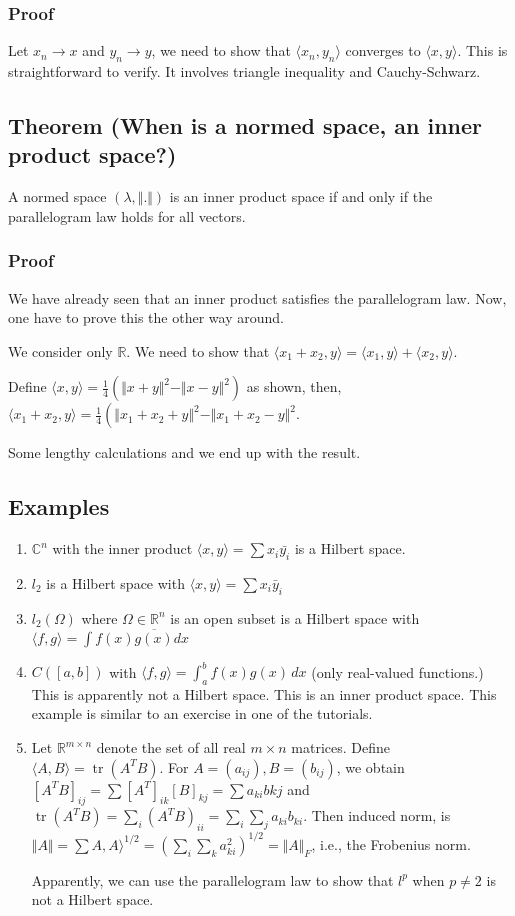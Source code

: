 \documentclass[11pt]{article}
\def\R{\mathbb{R}}
\def\C{\mathbb{C}}
\def\tr{\operatorname{tr}}
\begin{document}
\subsubsection{Proof}
\label{sec:org6f07355}
Let \(x_n \rightarrow x\) and \(y_n \rightarrow y\), we need to show that
\(\langle x_n, y_n \rangle\) converges to \(\langle x, y \rangle\). This is
straightforward to verify. It involves triangle inequality and
Cauchy-Schwarz.
\subsection{Theorem (When is a normed space, an inner product space?)}
\label{sec:org19e9f3a}
A normed space \((\lambda, \Vert . \Vert)\) is an inner product space if and
only if the parallelogram law holds for all vectors.
\subsubsection{Proof}
\label{sec:orgaf7f69e}
We have already seen that an inner product satisfies the parallelogram law.
Now, one have to prove this the other way around.

We consider only \(\R\). We need to show that \(\langle x_1 + x_2, y \rangle =
    \langle x_1, y \rangle + \langle x_2, y \rangle\).

Define \(\langle x, y \rangle = \frac{1}{4}(\Vert x + y \Vert^2 - \Vert x-
    y\Vert^2)\) as shown, then, \(\langle x_1 + x_2, y \rangle =
    \frac{1}{4}\left(\Vert x_1 + x_2 + y \Vert^2 - \Vert x_1 +x_2 - y \Vert^2\).

Some lengthy calculations and we end up with the result.
\subsection{Examples}
\label{sec:org60b92c4}
\begin{enumerate}
\item \(\C^n\) with the inner product \(\langle x, y \rangle = \sum x_i \bar{y_i}\)
is a Hilbert space.
\item \(l_2\) is a Hilbert space with \(\langle x, y \rangle = \sum x_i \bar{y}_i\)
\item \(l_2(\Omega)\) where \(\Omega \in \R^n\) is an open subset is a Hilbert space
with \(\langle f, g \rangle = \int f(x)\overline{g(x)} dx\)
\item \(C([a, b])\) with \(\langle f, g \rangle = \int_{a}^{b} f(x)g(x)\, dx\) (only
real-valued functions.) This is apparently not a Hilbert space. This is an
inner product space. This example is similar to an exercise in one of the
tutorials.
\item Let \(\R^{m\times n}\) denote the set of all real \(m\times n\) matrices.
Define \(\langle A, B\rangle = \tr(A^TB)\). For \(A = (a_{ij}), B= (b_{ij})\),
we obtain \([A^TB]_{ij} = \sum [A^T]_{ik} [B]_{kj} = \sum a_{ki}b{kj}\) and
\(\tr(A^TB) = \sum_{i}(A^TB)_{ii} = \sum_i\sum_j a_{ki}b_{ki}\). Then
induced norm, is \(\Vert A \Vert = \sum A, A\rangle^{1/2} = \left(\sum_i
      \sum_k a_{ki}^2\right)^{1/2} = \Vert A \Vert_F\), i.e., the Frobenius norm.

Apparently, we can use the parallelogram law to show that \(l^p\) when
\(p\neq 2\) is not a Hilbert space.
\end{enumerate}
\end{document}
